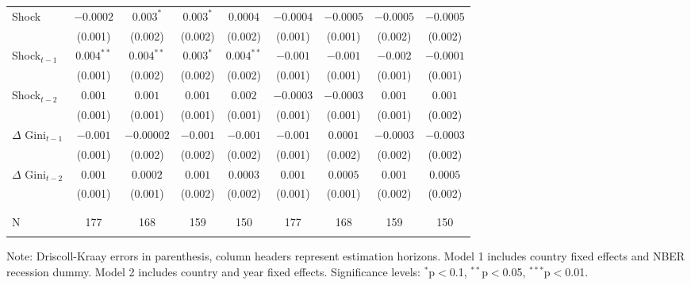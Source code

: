 \documentclass[12pt, a4paper]{article}
\begin{document}
\begin{table}[!htbp]
{\begin{tabular}{@{\extracolsep{5pt}}l cccccccc}
Shock & $-0.0002$ & $0.003^{*}$ & $0.003^{*}$ & $0.0004$ & $-0.0004$ & $-0.0005$ & $-0.0005$ & $-0.0005$ \\
 & (0.001) & (0.002) & (0.002) & (0.002) & (0.001) & (0.001) & (0.002) & (0.002) \\ [0.5em]
 
Shock$_{t-1}$  & $0.004^{**}$ & $0.004^{**}$ & $0.003^{*}$ & $0.004^{**}$ & $-0.001$ & $-0.001$ & $-0.002$ & $-0.0001$ \\
 & (0.001) & (0.002) & (0.002) & (0.002) & (0.001) & (0.001) & (0.001) & (0.001) \\ [0.5em]
 
Shock$_{t-2}$ & $0.001$ & $0.001$ & $0.001$ & $0.002$ & $-0.0003$ & $-0.0003$ & $0.001$ & $0.001$ \\
& (0.001) & (0.001) & (0.001) & (0.001) & (0.001) & (0.001) & (0.001) & (0.002) \\ [0.5em]

$\Delta$ Gini$_{t-1}$ & $-0.001$ & $-0.00002$ & $-0.001$ & $-0.001$ & $-0.001$ & $0.0001$ & $-0.0003$ & $-0.0003$ \\ 
  & (0.001) & (0.002) & (0.002) & (0.002) & (0.001) & (0.002) & (0.002) & (0.002) \\  [0.5em]

$\Delta$ Gini$_{t-2}$ & $0.001$ & $0.0002$ & $0.001$ & $0.0003$ & $0.001$ & $0.0005$ & $0.001$ & $0.0005$ \\ 
  & (0.001) & (0.001) & (0.002) & (0.002) & (0.001) & (0.001) & (0.002) & (0.002) \\  [1em]
\\[-1.8ex] \hline \\[-1.8ex] 
N & 177 & 168 & 159 & 150 & 177 & 168 & 159 & 150 \\ 
\hline \\[-1.8ex]
\end{tabular}
}
\begin{minipage}{\textwidth}
    \vspace{0.1cm} 
    \footnotesize  Note: Driscoll-Kraay errors in parenthesis, column headers represent estimation horizons. Model 1 includes country fixed effects and NBER recession dummy. Model 2 includes country and year fixed effects. Significance levels: $^{*}$p$<$0.1, $^{**}$p$<$0.05, $^{***}$p$<$0.01.
\end{minipage}
\end{table}
\end{document}
